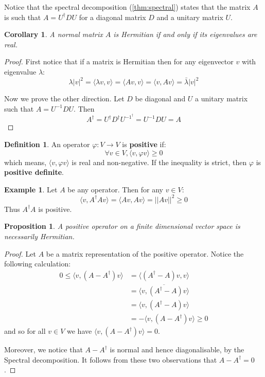 \documentclass[12pt]{article}
\theoremstyle{plain}
\newtheorem{proposition}[thm]{Proposition}
\newtheorem{cor}[thm]{Corollary}
\theoremstyle{definition}
\newtheorem{defn}[thm]{Definition} %
\newtheorem{example}[thm]{Example}
\newcommand{\lto}{\longrightarrow}
\begin{document}
Notice that the spectral decomposition (\ref{thm:spectral}) states that the matrix $A$ is such that $A = U^\dagger DU$ for a diagonal matrix $D$ and a unitary matrix $U$.
\begin{cor}
	A normal matrix $A$ is Hermitian if and only if its eigenvalues are real.
\end{cor}
\begin{proof}
	First notice that if a matrix is Hermitian then for any eigenvector $v$ with eigenvalue $\lambda$:
	\begin{equation}
		\lambda |v|^2 = \langle \lambda v,v \rangle = \langle Av, v \rangle = \langle v,Av \rangle = \bar{\lambda}|v|^2
	\end{equation}
	
	Now we prove the other direction.  Let $D$ be diagonal and $U$ a unitary matrix such that $A = U^{-1}DU$. Then
	\begin{equation}
		A^\dagger = U^{\dagger}D^\dagger U^{-1^\dagger} = U^{-1}DU = A
	\end{equation}
\end{proof}
\begin{defn}
	An operator $\varphi: V \lto V$ is \textbf{positive} if:
	\begin{equation}
		\forall v \in V, \langle v, \varphi v\rangle \geq 0
	\end{equation}
	which means, $\langle v, \varphi v\rangle$ is real and non-negative. If the inequality is strict, then $\varphi$ is \textbf{positive definite}.
\end{defn}
\begin{example}
	Let $A$ be any operator. Then for any $v \in V$:
	\begin{equation}
		\langle v, A^\dagger Av\rangle = \langle Av, Av \rangle = ||Av||^2 \geq 0
	\end{equation}
	Thus $A^\dagger A$ is positive.
\end{example}
\begin{proposition}\label{prop:positive_finite_=>_Hermitian}
	A positive operator on a finite dimensional vector space is necessarily Hermitian.
\end{proposition}
\begin{proof}
	Let $A$ be a matrix representation of the positive operator. Notice the following calculation:
	\begin{align*}
		0 \leq \langle v, (A - A^\dagger)v\rangle &= \langle (A^\dagger - A)v,v\rangle\\
		&= \overline{\langle v, (A^\dagger - A)v\rangle}\\
		&= \langle v, (A^\dagger - A)v\rangle\\
		&= -\langle v, (A - A^\dagger)v\rangle \geq 0
	\end{align*}
	and so for all $v \in V$ we have $\langle v, (A - A^\dagger)v\rangle = 0$.
	
	Moreover, we notice that $A - A^\dagger$ is normal and hence diagonalisable, by the Spectral decomposition. It follows from these two observations that $A - A^\dagger = 0$.
\end{proof}
\end{document}

